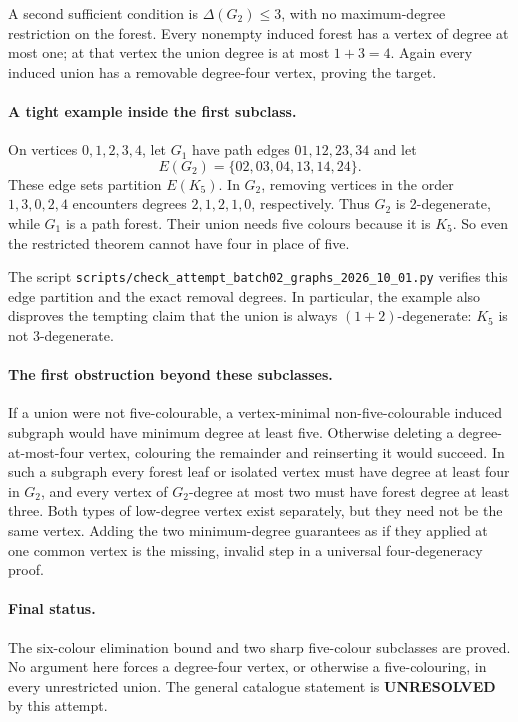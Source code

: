 \documentclass[11pt,a4paper]{article}
\begin{document}
A second sufficient condition is $\Delta(G_2)\le3$, with no maximum-degree restriction on the forest. Every nonempty induced forest has a vertex of degree at most one; at that vertex the union degree is at most $1+3=4$. Again every induced union has a removable degree-four vertex, proving the target.

\paragraph{A tight example inside the first subclass.}
On vertices $0,1,2,3,4$, let $G_1$ have path edges $01,12,23,34$ and let
\[
 E(G_2)=\{02,03,04,13,14,24\}.
\]
These edge sets partition $E(K_5)$. In $G_2$, removing vertices in the order $1,3,0,2,4$ encounters degrees $2,1,2,1,0$, respectively. Thus $G_2$ is 2-degenerate, while $G_1$ is a path forest. Their union needs five colours because it is $K_5$. So even the restricted theorem cannot have four in place of five.

The script \texttt{scripts/check\_attempt\_batch02\_graphs\_2026\_10\_01.py} verifies this edge partition and the exact removal degrees. In particular, the example also disproves the tempting claim that the union is always $(1+2)$-degenerate: $K_5$ is not 3-degenerate.

\paragraph{The first obstruction beyond these subclasses.}
If a union were not five-colourable, a vertex-minimal non-five-colourable induced subgraph would have minimum degree at least five. Otherwise deleting a degree-at-most-four vertex, colouring the remainder and reinserting it would succeed. In such a subgraph every forest leaf or isolated vertex must have degree at least four in $G_2$, and every vertex of $G_2$-degree at most two must have forest degree at least three. Both types of low-degree vertex exist separately, but they need not be the same vertex. Adding the two minimum-degree guarantees as if they applied at one common vertex is the missing, invalid step in a universal four-degeneracy proof.

\paragraph{Final status.}
The six-colour elimination bound and two sharp five-colour subclasses are proved. No argument here forces a degree-four vertex, or otherwise a five-colouring, in every unrestricted union. The general catalogue statement is \textbf{UNRESOLVED} by this attempt.
\end{document}
